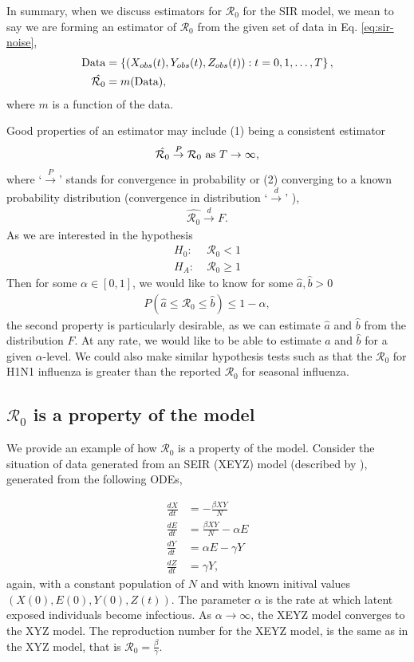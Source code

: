 \documentclass[12pt]{article}
\newcommand{\rr}{\ensuremath{\mathcal{R}_0}}
\begin{document}
In summary, when we discuss estimators for $\rr$ for the SIR model, we mean to say we are forming an estimator of $\rr$ from the given set of data in Eq. \ref{eq:sir-noise},
\begin{align*}
  \textnormal{Data} &= \left \{\left (X_{obs}(t), Y_{obs}(t), Z_{obs}(t) \right ) : t=0, 1, \dots, T\right \}, \\
  \hat{\rr} &= m(\textnormal{Data}),
\end{align*}
where $m$ is a function of the data.

Good properties of an estimator may include (1) being a consistent estimator
\begin{align*}
  \hat{\rr} \overset{P}{\to} \rr \textnormal{ as } T\to \infty,
\end{align*}
where `$\overset{P}{\to}$' stands for convergence in probability \citep{wasserman2004} or (2) converging to a known probability distribution (convergence in distribution `$\overset{d}{\to}$' \citep{wasserman2004}),
\begin{align*}
\hat{\rr} \overset{d}{\to} F.  
\end{align*}
As we are interested in the hypothesis
\begin{align*}
  H_0:\;& \rr < 1 \\
  H_A:\;& \rr \ge 1
\end{align*}
Then for some $\alpha \in [0,1]$, we would like to know for some $\hat{a}, \hat{b} >0$
\begin{align*}
P(\hat{a} \le \rr \le \hat{b}) \le 1 - \alpha,  
\end{align*}
the second property is particularly desirable, as we can estimate $\hat{a}$ and $\hat{b}$ from the distribution $F$.  At any rate, we would like to be able to estimate $\hat{a}$ and $\hat{b}$ for a given $\alpha$-level.  We could also make similar hypothesis tests such as that the $\rr$ for H1N1 influenza is greater than the reported $\rr$ for seasonal influenza.

\subsection{$\rr$ is a property of the model}

We provide an example of how $\rr$ is a property of the model.  Consider the situation of data generated from an SEIR (XEYZ) model (described by \cite{cintronarias2009}), generated from the following ODEs,

\begin{align*}
  \frac{dX}{dt} &= - \frac{\beta XY}{N} \\
  \frac{dE}{dt} &= \frac{\beta XY}{N}  - \alpha E\\
  \frac{dY}{dt} &= \alpha E - \gamma Y \\
  \frac{dZ}{dt} &= \gamma Y,
\end{align*}
again, with a constant population of $N$ and with known initival values $(X(0), E(0), Y(0), Z(t))$.  The parameter $\alpha$ is the rate at which latent exposed individuals become infectious.  As $\alpha \to \infty$, the XEYZ model converges to the XYZ model.  The reproduction number for the XEYZ model, is the same as in the XYZ model, that is $\rr = \frac{\beta}{\gamma}$.
\end{document}
